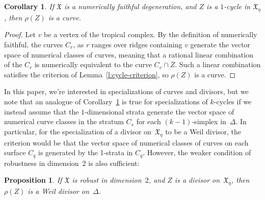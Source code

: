 \documentclass[11pt,reqno]{amsart}
\newtheorem{prop}[thm]{Proposition}
\newtheorem{cor}[thm]{Corollary}
\theoremstyle{definition}
\newcommand{\X}{\mathfrak X}
\begin{document}
\begin{cor}\label{c:specialization-curve}
If $\X$ is a numerically faithful degeneration, and $Z$ is a $1$-cycle in
$\X_\eta$, then $\rho(Z)$ is a curve.
\end{cor}

\begin{proof}
Let $v$ be a vertex of the tropical complex. By the definition of numerically
faithful, the curves $C_r$, as $r$ ranges over ridges containing $v$ generate
the vector space of numerical classes of curves, meaning that a rational linear
combination of the $C_r$ is numerically equivalent to the curve $C_v \cap
\overline Z$. Such a linear combination satisfies the criterion of
Lemma~\ref{l:cycle-criterion}, so $\rho(Z)$ is a curve.
\end{proof}

In this paper, we're interested in specializations of curves and divisors, but
we note that an analogue of Corollary~\ref{c:specialization-curve} is true for
specializations of $k$-cycles if we instead assume that the $1$-dimensional
strata generate the vector space of numerical curve classes in the stratum $C_s$
for each $(k-1)$-simplex in~$\Delta$. In particular, for the specialization of a
divisor on~$\X_\eta$ to be a Weil divisor, the criterion would be that the vector
space of numerical classes of curves on each surface $C_q$ is generated by the
1-strata in $C_q$. However, the weaker condition of robustness in dimension~2 is
also sufficient:

\begin{prop}\label{p:specialization-divisor}
If $\X$ is robust in dimension~$2$, and $Z$ is a divisor on~$\X_\eta$, then
$\rho(Z)$ is a Weil divisor on~$\Delta$.
\end{prop}
\end{document}
